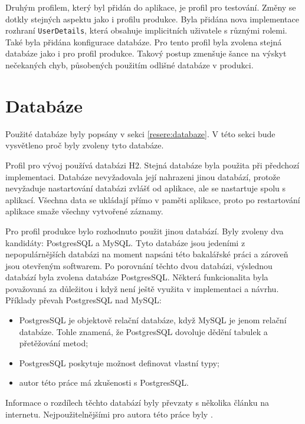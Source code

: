     Druhým profilem, který byl přidán do aplikace, je profil pro testování. Změny se dotkly stejných aspektu jako i profilu produkce. Byla přidána nova implementace rozhraní \verb|UserDetails|, která obsahuje implicitních uživatele s různými rolemi. Také byla přidána konfigurace databáze. Pro tento profil byla zvolena stejná databáze jako i pro profil produkce. Takový postup zmenšuje šance na výskyt nečekaných chyb, působených použitím odlišné databáze v produkci.
    
\section{Databáze} \label{navrh:db}
    Použité databáze byly popsány v sekci \ref{resere:databaze}. V této sekci bude vysvětleno proč byly zvoleny tyto databáze.
    
    Profil pro vývoj používá databázi H2. Stejná databáze byla použita při předchozí implementaci. Databáze nevyžadovala její nahrazeni jinou databází, protože nevyžaduje nastartování databázi zvlášť od aplikace, ale se nastartuje spolu s aplikací. Všechna data se ukládají přímo v paměti aplikace, proto po restartování aplikace smaže všechny vytvořené záznamy.
    
    Pro profil produkce bylo rozhodnuto použit jinou databází. Byly zvoleny dva kandidáty: PostgresSQL a MySQL. Tyto databáze jsou jedeními z nepopulárnějších databázi na moment napsáni této bakalářské práci a zároveň jsou otevřeným softwarem. Po porovnání těchto dvou databázi, výslednou databází byla zvolena databáze PostgresSQL. Některá funkcionalita byla považovaná za důležitou i když není ještě využita v implementaci a návrhu. Příklady převah PostgresSQL nad MySQL: 
    \begin{itemize}
            \item PostgresSQL je objektově relační databáze\cite{postgres-about}, když MySQL je jenom relační databáze\cite{mysql-wiki}. Tohle znamená, že PostgresSQL dovoluje dědění tabulek a přetěžování metod;
            \item PostgresSQL poskytuje možnost definovat vlastní typy\cite{pstgres-create-type};
            \item autor této práce má zkušenosti s PostgresSQL.
    \end{itemize}
    Informace o rozdílech těchto databází byly převzaty s několika článku na internetu. Nejpoužitelnějšími pro autora této práce byly \cite{mysql-postgres1, mysql-postgres2}.
    
